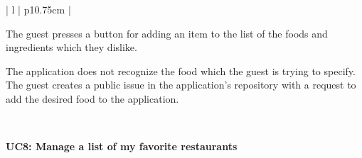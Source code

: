 \begin{center}
\begin{tabular}{| l | p{10.75cm} | }
\begin{minipage}[t]{\linewidth}
\begin{description}[nosep,after=\strut]
        \item [A2:] The guest presses a button for adding an item to the list of the foods and ingredients which they dislike.
        \item [A3:] The application does not recognize the food which the guest is trying to specify. The guest creates a public issue in the application's repository with a request to add the desired food to the application.
      \end{description}
    \end{minipage}
    \\
    \hline
  \end{tabular}
  \newline
\end{center}

\newpage

\noindent \textbf{UC8: Manage a list of my favorite restaurants}
